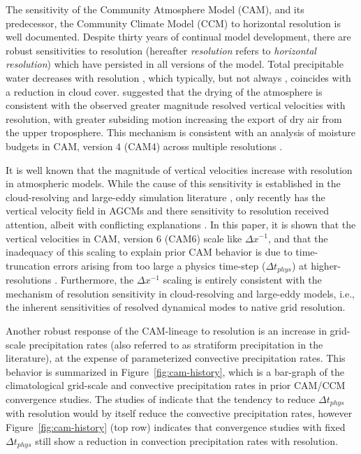 \documentclass[times]{qjrms4}
\begin{document}
The sensitivity of the Community Atmosphere Model (CAM), and its predecessor, the Community Climate Model (CCM) to horizontal resolution is well documented. Despite thirty years of continual model development, there are robust sensitivities to resolution (hereafter {\em{resolution}} refers to {\em{horizontal resolution}}) which have persisted in all versions of the model. Total precipitable water decreases with resolution \citep{KW1991JGR,WETAL1995CD,W2008TELLUS,RETAL2013JCLIM,ZetAl2014JCb,HR2017JCLIM}, which typically, but not always \citep[see][]{WETAL1995CD,ZetAl2014JCb}, coincides with a reduction in cloud cover. \cite{KW1991JGR,WETAL1995CD} suggested that the drying of the atmosphere is consistent with the observed greater magnitude resolved vertical velocities with resolution, with greater subsiding motion increasing the export of dry air from the upper troposphere. This mechanism is consistent with an analysis of moisture budgets in CAM, version 4 (CAM4) across multiple resolutions \citep{YETAL2014JCLIM,HR2017JCLIM}.

It is well known that the magnitude of vertical velocities increase with resolution in atmospheric models. While the cause of this sensitivity is established in the cloud-resolving and large-eddy simulation literature \citep[see][and references therein]{J2017JAMES}, only recently has the vertical velocity field in AGCMs and there sensitivity to resolution received attention, albeit with conflicting explanations \citep{DETALA2016ACP,RETAL2016CD,HR2018JAMES}. In this paper, it is shown that the vertical velocities in CAM, version 6 (CAM6) scale like $\Delta x^{-1}$, and that the inadequacy of this scaling to explain prior CAM behavior \citep{HR2017JCLIM} is due to time-truncation errors arising from too large a physics time-step ($\Delta t_{phys}$) at higher-resolutions \citep{HR2018JAMES,HETAL2019JAMES}. Furthermore, the $\Delta x^{-1}$ scaling is entirely consistent with the mechanism of resolution sensitivity in cloud-resolving and large-eddy models, i.e., the inherent sensitivities of resolved dynamical modes to native grid resolution.

Another robust response of the CAM-lineage to resolution is an increase in grid-scale precipitation rates (also referred to as stratiform precipitation in the literature), at the expense of parameterized convective precipitation rates. This behavior is summarized in Figure~\ref{fig:cam-history}, which is a bar-graph of the climatological grid-scale and convective precipitation rates in prior CAM/CCM convergence studies. The studies of \cite{KW1991JGR,WETAL1995CD,W2013QJRMS} indicate that the tendency to reduce $\Delta t_{phys}$ with resolution would by itself reduce the convective precipitation rates, however Figure~\ref{fig:cam-history} (top row) indicates that convergence studies with fixed $\Delta t_{phys}$ still show a reduction in convection precipitation rates with resolution.
\end{document}
